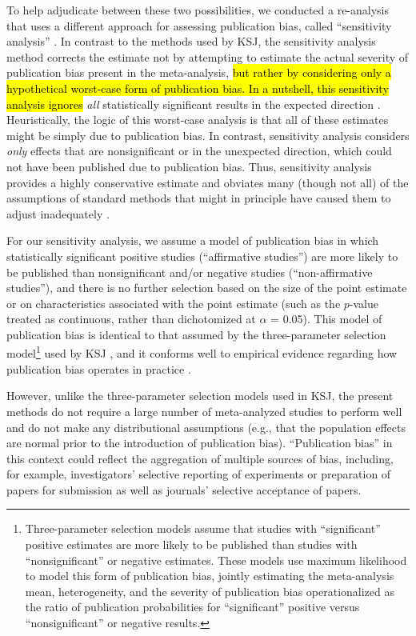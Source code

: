 \documentclass[man,floatsintext]{apa7}
\begin{document}
To help adjudicate between these two possibilities, we conducted a re-analysis that uses a different approach for assessing publication bias, called ``sensitivity analysis'' \parencite{mathur2019sensitivity}. In contrast to the methods used by KSJ, the sensitivity analysis method corrects the estimate not by attempting to estimate the actual severity of publication bias present in the meta-analysis, \hl{but rather by considering only a hypothetical worst-case form of publication bias. In a nutshell, this sensitivity analysis ignores} \emph{all} statistically significant results in the expected direction \parencite{mathur2019sensitivity}. Heuristically, the logic of this worst-case analysis is that all of these estimates might be simply due to publication bias. In contrast, sensitivity analysis considers \emph{only} effects that are nonsignificant or in the unexpected direction, which could not have been published due to publication bias. Thus, sensitivity analysis provides a highly conservative estimate and obviates many (though not all) of the assumptions of standard methods that might in principle have caused them to adjust inadequately \parencite{mathur2019sensitivity}.

For our sensitivity analysis, we assume a model of publication bias in which  statistically significant positive studies (``affirmative studies'') are more likely to be published than nonsignificant and/or negative studies (``non-affirmative studies''), and there is no further selection based on the size of the point estimate or on characteristics associated with the point estimate (such as the $p$-value treated as continuous, rather than dichotomized at $\alpha$ = 0.05). This model of publication bias is identical to that assumed by the three-parameter selection model\footnote{Three-parameter selection models assume that studies with ``significant'' positive estimates are more likely to be published than studies with ``nonsignificant'' or negative estimates. These models use maximum likelihood to model this form of publication bias, jointly estimating the meta-analysis mean, heterogeneity, and the severity of publication bias operationalized as the ratio of publication probabilities for ``significant'' positive versus ``nonsignificant'' or negative results.} used by KSJ \parencite{vevea1995general}, and it conforms well to empirical evidence regarding how publication bias operates in practice \parencite{sapbe, gelman2014beyond, masicampo2012peculiar}. 

However, unlike the three-parameter selection models used in KSJ, the present methods do not require a large number of meta-analyzed studies to perform well \parencite{mcshane2016adjusting, carter2019correcting} and do not make any distributional assumptions (e.g., that the population effects are normal prior to the introduction of publication bias). ``Publication bias'' in this context could reflect the aggregation of multiple sources of bias, including, for example, investigators’ selective reporting of experiments or preparation of papers for submission as well as journals’ selective acceptance of papers. 
\end{document}

